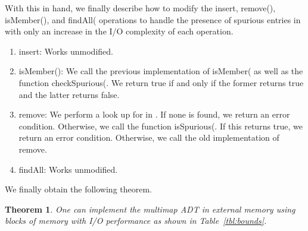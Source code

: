 \documentclass[11pt,letterpaper]{article}
\newtheorem{theorem}{Theorem}
\begin{document}
With this in hand, we finally describe how to modify the insert, remove(), isMember(), and findAll( operations
to handle the presence of spurious entries in  with only an  increase in the I/O complexity of each operation.

\begin{enumerate}
\item
insert: Works unmodified.
\item isMember(): We call the previous implementation of isMember( as well as the function checkSpurious(. We return true if and only if the former
returns true and the latter returns false.
\item remove:  We 
perform a look up for  in . If none is found, we return an error condition. Otherwise, we call the function isSpurious(. If this returns true,
we return an error condition. Otherwise, we 
call the old implementation of remove. 
\item findAll: Works unmodified.
\end{enumerate}

We finally obtain the following theorem.

\begin{theorem}
One can implement the multimap ADT in external memory using  blocks of memory with 
I/O performance as shown in Table~\ref{tbl:bounds}.
\end{theorem}
\end{document}
